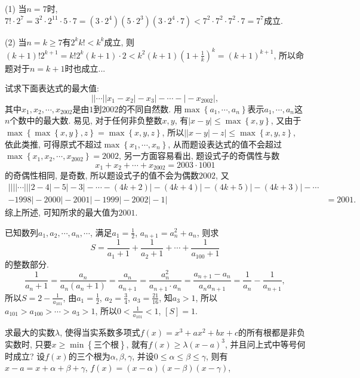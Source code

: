 (1) 当$n=7$时, $7!\cdot2^{7}=3^{2}\cdot2^{11}\cdot5\cdot7=\left(3\cdot2^{4}\right)\left(5\cdot2^{3}\right)\left(3\cdot2^{4}\cdot7\right)<7^{2}\cdot7^{2}\cdot7^{2}\cdot7=7^{7}$成立.

(2) 当$n=k\ge7$有$2^{k}k!<k^{k}$成立, 则$\left(k+1\right)!2^{k+1}=k!2^{k}\left(k+1\right)\cdot2<k^{2}\left(k+1\right)\left(1+\frac{1}{k}\right)^{k}=\left(k+1\right)^{k+1}$,
所以命题对于$n=k+1$时也成立...
\ea

\bq{}{}
试求下面表达式的最大值:
\[
\left|\left|\cdots\left|\left|x_{1}-x_{2}\right|-x_{3}\right|-\cdots-\right|-x_{2002}\right|,
\]
其中$x_{1},x_{2},\cdots,x_{2002}$是由$1$到$2002$的不同自然数.
\eq
\ba
用$\max\left\{ a_{1},\cdots,a_{n}\right\} $表示$a_{1},\cdots,a_{n}$这$n$个数中的最大数.
易见, 对于任何非负整数$x,y$, 有$\left|x-y\right|\le\max\left\{ x,y\right\} $,
又由于$\max\left\{ \max\left\{ x,y\right\} ,z\right\} =\max\left\{ x,y,z\right\} $,
所以$\left|\left|x-y\right|-z\right|\le\max\left\{ x,y,z\right\} $,
依此类推, 可得原式不超过$\max\left\{ x_{1},\cdots,x_{n}\right\} $, 从而题设表达式的值不会超过$\max\left\{ x_{1},x_{2},\cdots,x_{2002}\right\} =2002$,
另一方面容易看出, 题设式子的奇偶性与数
\[
x_{1}+x_{2}+\cdots+x_{2002}=2003\cdot1001
\]
的奇偶性相同, 是奇数, 所以题设式子的值不会为偶数$2002$, 又
\[
\begin{aligned}\left|\left|\left|\left|\cdots\left|\left|\left|2-4\right|-5\right|-3\right|-\cdots-\left(4k+2\right)\right|-\left(4k+4\right)\right|-\left(4k+5\right)\right|-\left(4k+3\right)\right|-\cdots\\
-\left.1998\right|-\left.2000\right|-\left.2001\right|-\left.1999\right|-\left.2002\right|-\left.1\right| & =2001.
\end{aligned}
\]
综上所述, 可知所求的最大值为$2001$.
\ea

\bq{}{}
已知数列$a_{1},a_{2},\cdots,a_{n},\cdots$, 满足$a_{1}=\frac{1}{2}$, $a_{n+1}=a_{n}^{2}+a_{n}$,
则求
\[
S=\frac{1}{a_{1}+1}+\frac{1}{a_{2}+1}+\cdots+\frac{1}{a_{100}+1}
\]
的整数部分.
\eq
\ba
\[
\frac{1}{a_{n}+1}=\frac{a_{n}}{a_{n}\left(a_{n}+1\right)}=\frac{a_{n}}{a_{n+1}}=\frac{a_{n}^{2}}{a_{n+1}\cdot a_{n}}=\frac{a_{n+1}-a_{n}}{a_{n}a_{n+1}}=\frac{1}{a_{n}}-\frac{1}{a_{n+1}},
\]
所以$S=2-\frac{1}{a_{101}}$, 由$a_{1}=\frac{1}{2}$, $a_{2}=\frac{3}{4}$,
$a_{3}=\frac{21}{16}$, 知$a_{3}>1$, 所以$a_{101}>a_{100}>\cdots>a_{3}>1$,
所以$0<\frac{1}{a_{101}}<1$, $\left[S\right]=1$.
\ea

\bq{}{}
求最大的实数$\lambda$, 使得当实系数多项式$f\left(x\right)=x^{3}+ax^{2}+bx+c$的所有根都是非负实数时,
只要$x\ge\min\left\{ \text{三个根}\right\} $, 就有$f\left(x\right)\ge\lambda\left(x-a\right)^{3}$,
并且问上式中等号何时成立?
\eq
\ba
设$f\left(x\right)$的三个根为$\alpha,\beta,\gamma$, 并设$0\le\alpha\le\beta\le\gamma$,
则有$x-a=x+\alpha+\beta+\gamma$, $f\left(x\right)=\left(x-\alpha\right)\left(x-\beta\right)\left(x-\gamma\right)$,

